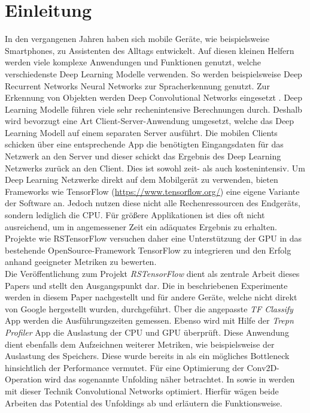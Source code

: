 \section{Einleitung}
\label{sec:einleitung}
In den vergangenen Jahren haben sich mobile Geräte, wie beispielsweise Smartphones, zu Assistenten des Alltags entwickelt. Auf diesen kleinen Helfern werden viele komplexe Anwendungen und Funktionen genutzt, welche verschiedenste Deep Learning Modelle verwenden. So werden beispielsweise Deep Recurrent Networks Neural Networks zur Spracherkennung \cite{bspSpracherkennung} genutzt. Zur Erkennung von Objekten werden Deep Convolutional Networks eingesetzt \cite{bspObjekterkennung}. Deep Learning Modelle führen viele sehr rechenintensive Berechnungen durch. Deshalb wird bevorzugt eine Art Client-Server-Anwendung umgesetzt, welche das Deep Learning Modell auf einem separaten Server ausführt. Die mobilen Clients schicken über eine entsprechende App die benötigten Eingangsdaten für das Netzwerk an den Server und dieser schickt das Ergebnis des Deep Learning Netzwerks zurück an den Client. Dies ist sowohl zeit- als auch kostenintensiv. Um Deep Learning Netzwerke direkt auf dem Mobilgerät zu verwenden, bieten Frameworks wie TensorFlow (\url{https://www.tensorflow.org/}) eine eigene Variante der Software an. Jedoch nutzen diese nicht alle Rechenressourcen des Endgeräts, sondern lediglich die CPU. Für größere Applikationen ist dies oft nicht ausreichend, um in angemessener Zeit ein adäquates Ergebnis zu erhalten. Projekte wie RSTensorFlow \cite{rstensorflow2017} versuchen daher eine Unterstützung der GPU in das bestehende OpenSource-Framework TensorFlow zu integrieren und den Erfolg anhand geeigneter Metriken zu bewerten. \\
Die Veröffentlichung zum Projekt \textit{RSTensorFlow} \cite{rstensorflow2017} dient als zentrale Arbeit dieses Papers und stellt den Ausgangspunkt dar. Die in \cite{rstensorflow2017} beschriebenen Experimente werden in diesem Paper nachgestellt und für andere Geräte, welche nicht direkt von Google hergestellt wurden, durchgeführt. Über die angepasste \textit{TF Classify} App werden die Ausführungszeiten gemessen. Ebenso wird mit Hilfe der \textit{Trepn Profiler} App die Auslastung der CPU und GPU überprüft. Diese Anwendung dient ebenfalls dem Aufzeichnen weiterer Metriken, wie beispielsweise der Auslastung des Speichers. Diese wurde bereits in \cite{rstensorflow2017} als ein mögliches Bottleneck hinsichtlich der Performance vermutet. Für eine Optimierung der Conv2D-Operation wird das sogenannte Unfolding näher betrachtet. In \cite{conv2d-optimizing-unfolding} sowie in \cite{Rajbhandari:2017:OCM:3037697.3037745} werden mit dieser Technik Convolutional Networks optimiert. Hierfür wägen beide Arbeiten das Potential des Unfoldings ab und erläutern die Funktionsweise. 
\\ 
